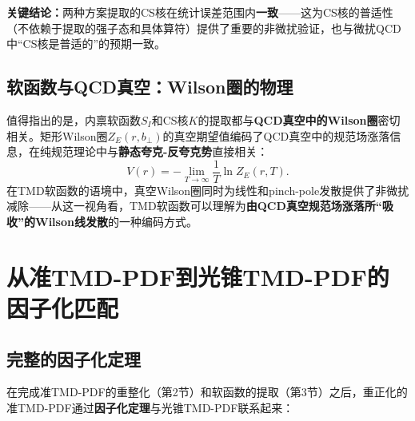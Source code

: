 \documentclass[12pt,a4paper]{ctexart}
\theoremstyle{definition}
\begin{document}
\textbf{关键结论：}两种方案提取的CS核在统计误差范围内\textbf{一致}——这为CS核的普适性（不依赖于提取的强子态和具体算符）提供了重要的非微扰验证，也与微扰QCD中``CS核是普适的''的预期一致。

\subsection{软函数与QCD真空：Wilson圈的物理}

值得指出的是，内禀软函数$S_I$和CS核$K$的提取都与\textbf{QCD真空中的Wilson圈}密切相关。矩形Wilson圈$Z_E(r, b_\perp)$的真空期望值编码了QCD真空中的规范场涨落信息，在纯规范理论中与\textbf{静态夸克-反夸克势}直接相关：
\begin{equation}
V(r) = -\lim_{T\to\infty} \frac{1}{T} \ln Z_E(r, T).
\end{equation}
在TMD软函数的语境中，真空Wilson圈同时为线性和pinch-pole发散提供了非微扰减除——从这一视角看，TMD软函数可以理解为\textbf{由QCD真空规范场涨落所``吸收''的Wilson线发散}的一种编码方式。

\section{从准TMD-PDF到光锥TMD-PDF的因子化匹配}

\subsection{完整的因子化定理}

在完成准TMD-PDF的重整化（第2节）和软函数的提取（第3节）之后，重正化的准TMD-PDF通过\textbf{因子化定理}与光锥TMD-PDF联系起来：
\end{document}
